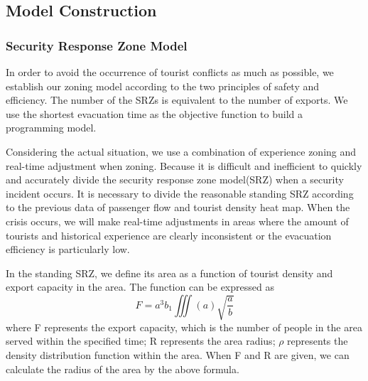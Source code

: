 \subsection{Model Construction}
\subsubsection{Security Response Zone Model}

In order to avoid the occurrence of tourist conflicts as much as possible, we establish our zoning model according to the two principles of safety and efficiency. The number of the SRZs is equivalent to the number of exports. We use the shortest evacuation time as the objective function to build a programming model.

Considering the actual situation, we use a combination of experience zoning and real-time adjustment when zoning. Because it is difficult and inefficient to quickly and accurately divide the security response zone model(SRZ) when a security incident occurs. It is necessary to divide the reasonable standing SRZ according to the previous data of passenger flow and tourist density heat map. When the crisis occurs, we will make real-time adjustments in areas where the amount of tourists and historical experience are clearly inconsistent or the evacuation efficiency is particularly low.

In the standing SRZ, we define its area as a function of tourist density and export capacity in the area. The function can be expressed as
\begin{equation}
    F=a^3b_1\iiint (a) \sqrt{\frac{a}{b}}
\end{equation}
where F represents the export capacity, which is the number of people in the area served within the specified time; R represents the area radius; $\rho$ represents the density distribution function within the area. When F and R are given, we can calculate the radius of the area by the above formula.

